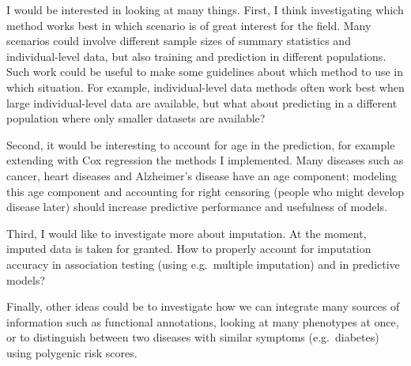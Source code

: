 I would be interested in looking at many things. 
First, I think investigating which method works best in which scenario is of great interest for the field. 
Many scenarios could involve different sample sizes of summary statistics and individual-level data, but also training and prediction in different populations.
Such work could be useful to make some guidelines about which method to use in which situation. For example, individual-level data methods often work best when large individual-level data are available, but what about predicting in a different population where only smaller datasets are available?

Second, it would be interesting to account for age in the prediction, for example extending with Cox regression the methods I implemented. Many diseases such as cancer, heart diseases and Alzheimer's disease have an age component; modeling this age component and accounting for right censoring (people who might develop disease later) should increase predictive performance and usefulness of models.

Third, I would like to investigate more about imputation. At the moment, imputed data is taken for granted. How to properly account for imputation accuracy in association testing (using e.g.\ multiple imputation) and in predictive models? 

Finally, other ideas could be to investigate how we can integrate many sources of information such as functional annotations, looking at many phenotypes at once, or to distinguish between two diseases with similar symptoms (e.g.\ diabetes) using polygenic risk scores.
